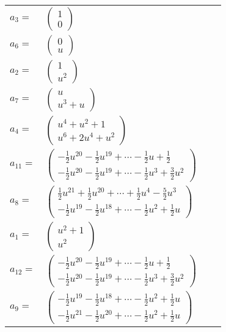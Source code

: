 \documentclass[1p]{elsarticle_modified}
\theoremstyle{definition}
\begin{document}
\begin{tabular}{m{7pt} m{180pt} m{7pt} m{180pt} }
\flushright $a_{3}=$&$\begin{pmatrix}1\\0\end{pmatrix}$ \\
\flushright $a_{6}=$&$\begin{pmatrix}0\\u\end{pmatrix}$ \\
\flushright $a_{2}=$&$\begin{pmatrix}1\\u^2\end{pmatrix}$ \\
\flushright $a_{7}=$&$\begin{pmatrix}u\\u^3+u\end{pmatrix}$ \\
\flushright $a_{4}=$&$\begin{pmatrix}u^4+u^2+1\\u^6+2 u^4+u^2\end{pmatrix}$ \\
\flushright $a_{11}=$&$\begin{pmatrix}-\frac{1}{2} u^{20}-\frac{1}{2} u^{19}+\cdots-\frac{1}{2} u+\frac{1}{2}\\-\frac{1}{2} u^{20}-\frac{1}{2} u^{19}+\cdots-\frac{1}{2} u^3+\frac{3}{2} u^2\end{pmatrix}$ \\
\flushright $a_{8}=$&$\begin{pmatrix}\frac{1}{2} u^{21}+\frac{1}{2} u^{20}+\cdots+\frac{1}{2} u^4-\frac{5}{2} u^3\\-\frac{1}{2} u^{19}-\frac{1}{2} u^{18}+\cdots-\frac{1}{2} u^2+\frac{1}{2} u\end{pmatrix}$ \\
\flushright $a_{1}=$&$\begin{pmatrix}u^2+1\\u^2\end{pmatrix}$ \\
\flushright $a_{12}=$&$\begin{pmatrix}-\frac{1}{2} u^{20}-\frac{1}{2} u^{19}+\cdots-\frac{1}{2} u+\frac{1}{2}\\-\frac{1}{2} u^{20}-\frac{1}{2} u^{19}+\cdots-\frac{1}{2} u^3+\frac{3}{2} u^2\end{pmatrix}$ \\
\flushright $a_{9}=$&$\begin{pmatrix}-\frac{1}{2} u^{19}-\frac{1}{2} u^{18}+\cdots-\frac{1}{2} u^2+\frac{1}{2} u\\-\frac{1}{2} u^{21}-\frac{1}{2} u^{20}+\cdots-\frac{1}{2} u^2+\frac{1}{2} u\end{pmatrix}$ \\

\end{tabular}
\end{document}
